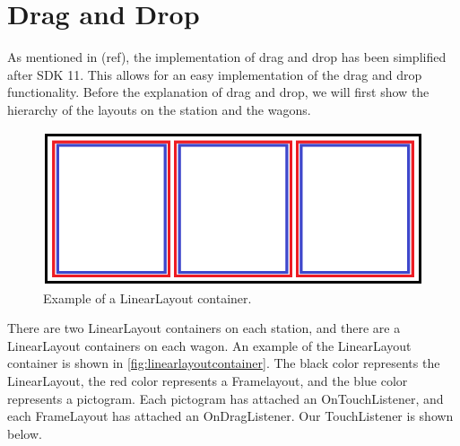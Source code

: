 \section{Drag and Drop}
As mentioned in (ref),  the implementation of drag and drop has been simplified after SDK 11. This allows for an easy implementation of the drag and drop functionality. Before the explanation of drag and drop, we will first show the hierarchy of the layouts on the station and the wagons.
\begin{figure}[H]
\centering
\includegraphics[width=0.9\linewidth]{img/layoutexample.png}%
\caption{Example of a LinearLayout container.}
\label{fig:linearlayoutcontainer}
\end{figure}
There are two LinearLayout containers on each station, and there are a LinearLayout containers on each wagon. An example of the LinearLayout container is shown in \autoref{fig:linearlayoutcontainer}. The black color represents the LinearLayout, the red color represents a Framelayout, and the blue color represents a pictogram. Each pictogram has attached an OnTouchListener, and each FrameLayout has attached an OnDragListener. Our TouchListener is shown below.

